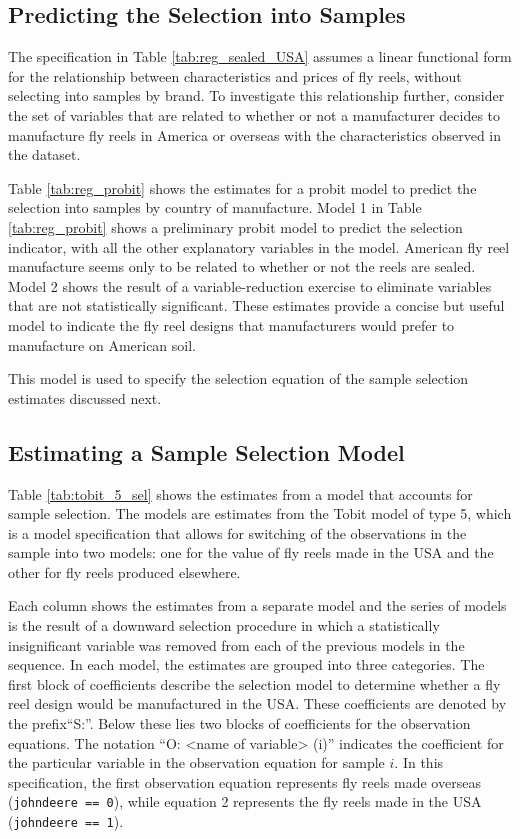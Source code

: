 \subsection{Predicting the Selection into Samples}


The specification in 
Table \ref{tab:reg_sealed_USA}
assumes a linear functional form for
the relationship between characteristics and prices of fly reels, 
without selecting into samples by brand.
% 
To investigate this relationship further, 
consider the set of variables that are related to
whether or not 
a manufacturer decides to manufacture fly reels in 
America or overseas
with the characteristics observed in the dataset. 



Table \ref{tab:reg_probit} 
shows the estimates for a probit model to predict the selection
into samples by country of manufacture.
% 
Model 1 in Table \ref{tab:reg_probit} 
shows a preliminary probit model to predict the selection indicator,
with all the other explanatory variables in the model.
American fly reel manufacture seems only to be related to 
whether or not the reels are sealed.
% 
Model 2 shows the result of a variable-reduction exercise
to eliminate variables that are not statistically significant.
These estimates provide a concise but useful model to
indicate the fly reel designs that manufacturers would 
prefer to manufacture on American soil.
% 

% 
This model is used to specify the selection equation
of the sample selection estimates discussed next. 


\subsection{Estimating a Sample Selection Model}

Table \ref{tab:tobit_5_sel} shows the estimates from a model that accounts for sample selection. 
The models are estimates from the Tobit model of type 5, 
which is a model specification that allows for switching 
of the observations in the sample into two models:
one for the value of fly reels made in the USA 
and the other for fly reels produced elsewhere.
% 

Each column shows the estimates from a separate model
and the series of models is the result of a downward selection
procedure in which a statistically insignificant variable
was removed from each of the previous models in the sequence. 
% 
In each model, the estimates are grouped into three categories.
% 
The first block of coefficients describe the selection model
to determine whether a fly reel design would be manufactured in the USA.
These coefficients are denoted by the prefix``S:''.
Below these lies two blocks of coefficients for the observation equations. 
The notation ``O: <name of variable> (i)''
indicates the coefficient for the particular variable
in the observation equation for sample $i$. 
In this specification, the first observation equation represents
fly reels made overseas (\texttt{johndeere == 0}), 
while equation 2 represents the fly reels made in the USA
(\texttt{johndeere == 1}).


